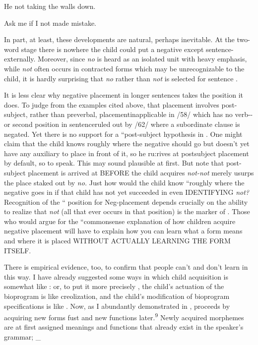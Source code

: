 \ea\label{ex:61}
 He not taking the walls down.
\glt
\z

\ea\label{ex:62}
 Ask me if I not made mistake.
\glt
\z



In part, at least, these developments are natural, perhaps inevit\-able. At the two-word stage there is nowhere the child could put a negative except sentence-externally. Moreover, since \textit{no} is heard as an isolated unit with heavy emphasis, while \textit{not} often occurs in contracted forms which may be unrecognizable to the child, it is hardly surprising that \textit{no} rather than \textit{not} is selected for sentence .

It is less clear why negative placement in longer sentences takes the position it does. To judge from the examples cited above, that placement involves post-subject, rather than preverbal, placement\-inapplicable in /58/ which has no verb-{}-or second position in sentence\-ruled out by /62/ where a subordinate clause is negated. Yet there is no support for a ``post-subject hypothesis in . One might claim that the child knows roughly where the negative should go but doesn't yet have any auxiliary to place in front of it, so he ru:rives at post\-subject placement by default, so to speak. This may sound plausible at first. But note that post-subject placement is arrived at BEFORE the child acquires \textit{not-not} merely usurps the place staked out by \textit{no.} Just how would the child know ``roughly where the negative goes in  if that child has not yet succeeded in even IDENTIFYING \textit{not?} Recognition of the `` position for Neg-placement depends crucially on the ability to realize that \textit{not} (all that ever occurs in that position) is the marker of . Those who would argue for the ``commonsense explanation of how children acquire negative place\-ment will have to explain how you can learn what a form means and where it is placed WITHOUT ACTUALLY LEARNING THE FORM ITSELF.

There is empirical evidence, too, to confirm that people can't and don't learn in this way. I have already suggested some ways in which child acquisition is somewhat like : or, to put it more precisely , the child's actuation of the bioprogram is like creoliza\-tion, and the child's modification of bioprogram specifications is like . Now, as I abundantly demonstrated in \citet{Bickerton1975},  proceeds by acquiring new forms fust and new functions later.\textsuperscript{9 }Newly acquired morphemes are at first assigned
meanings and functions that already exist in the speaker's grammar; \_

